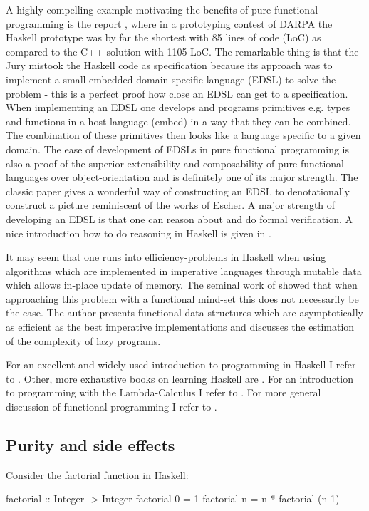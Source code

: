 A highly compelling example motivating the benefits of pure functional programming is the report \cite{hudak_haskell_1994}, where in a prototyping contest of DARPA the Haskell prototype was by far the shortest with 85 lines of code (LoC) as compared to the C++ solution with 1105 LoC. The remarkable thing is that the Jury mistook the Haskell code as specification because its approach was to implement a small embedded domain specific language (EDSL) to solve the problem - this is a perfect proof how close an EDSL can get to a specification. When implementing an EDSL one develops and programs primitives e.g. types and functions in a host language (embed) in a way that they can be combined. The combination of these primitives then looks like a language specific to a given domain. The ease of development of EDSLs in pure functional programming is also a proof of the superior extensibility and composability of pure functional languages over object-orientation and is definitely one of its major strength. The classic paper \cite{henderson_functional_1982} gives a wonderful way of constructing an EDSL to denotationally construct a picture reminiscent of the works of Escher. A major strength of developing an EDSL is that one can reason about and do formal verification. A nice introduction how to do reasoning in Haskell is given in \cite{hutton_tutorial_1999}.

It may seem that one runs into efficiency-problems in Haskell when using algorithms which are implemented in imperative languages through mutable data which allows in-place update of memory. The seminal work of \cite{okasaki_purely_1999} showed that when approaching this problem with a functional mind-set this does not necessarily be the case. The author presents functional data structures which are asymptotically as efficient as the best imperative implementations and discusses the estimation of the complexity of lazy programs.

For an excellent and widely used introduction to programming in Haskell I refer to \cite{hutton_programming_2016}. Other, more exhaustive books on learning Haskell are \cite{allen_haskell_2016, lipovaca_learn_2011}. For an introduction to programming with the Lambda-Calculus I refer to \cite{michaelson_introduction_2011}. For more general discussion of functional programming I refer to \cite{hudak_history_2007,hughes_why_1989,maclennan_functional_1990}.

\subsection{Purity and side effects}
\label{sec:purity_sideeffects}
Consider the factorial function in Haskell:
\begin{HaskellCode}
factorial :: Integer -> Integer
factorial 0 = 1
factorial n = n * factorial (n-1)
\end{HaskellCode}

